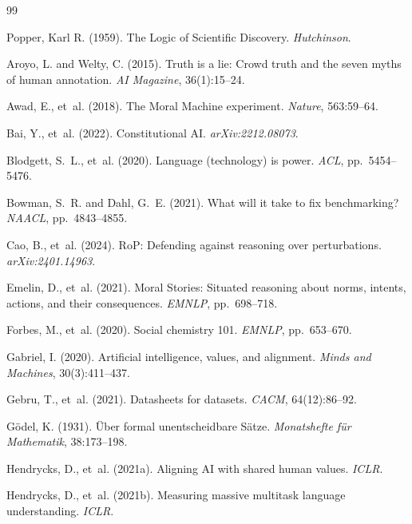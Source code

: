 \documentclass[11pt]{article}
\begin{document}

\begin{thebibliography}{99}

Popper, Karl R. (1959). The Logic of Scientific Discovery. \textit{Hutchinson}.

Aroyo, L. and Welty, C. (2015). Truth is a lie: Crowd truth and the seven myths of human annotation. \textit{AI Magazine}, 36(1):15--24.

Awad, E., et~al. (2018). The Moral Machine experiment. \textit{Nature}, 563:59--64.

Bai, Y., et~al. (2022). Constitutional AI. \textit{arXiv:2212.08073}.

Blodgett, S.~L., et~al. (2020). Language (technology) is power. \textit{ACL}, pp.~5454--5476.

Bowman, S.~R. and Dahl, G.~E. (2021). What will it take to fix benchmarking? \textit{NAACL}, pp.~4843--4855.

Cao, B., et~al. (2024). RoP: Defending against reasoning over perturbations. \textit{arXiv:2401.14963}.

Emelin, D., et~al. (2021). Moral Stories: Situated reasoning about norms, intents, actions, and their consequences. \textit{EMNLP}, pp.~698--718.

Forbes, M., et~al. (2020). Social chemistry 101. \textit{EMNLP}, pp.~653--670.

Gabriel, I. (2020). Artificial intelligence, values, and alignment. \textit{Minds and Machines}, 30(3):411--437.

Gebru, T., et~al. (2021). Datasheets for datasets. \textit{CACM}, 64(12):86--92.

G\"{o}del, K. (1931). \"{U}ber formal unentscheidbare S\"{a}tze. \textit{Monatshefte f\"{u}r Mathematik}, 38:173--198.

Hendrycks, D., et~al. (2021a). Aligning AI with shared human values. \textit{ICLR}.

Hendrycks, D., et~al. (2021b). Measuring massive multitask language understanding. \textit{ICLR}.


\end{thebibliography}
\end{document}
